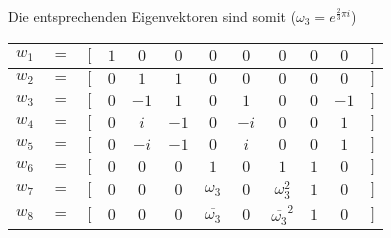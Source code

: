 Die entsprechenden Eigenvektoren sind somit ($\omega_3 = e^{\frac{2}{3} \pi i}$)
\begin{center}
\begin{tabular}{rclccccccccr}
$w_1$ & $=$ & $[$ & $1$ & $0$ & $0$ & $0$ & $0$ & $0$ & $0$ & $0$ & $]$ \\
\hline
$w_2$ & $=$ & $[$ & $0$ & $1$  & $1$ & $0$ & $0$ & $0$ & $0$ & $0$ & $]$ \\
$w_3$ & $=$ & $[$ & $0$ & $-1$ & $1$ & $0$ & $1$ & $0$ & $0$ & $-1$ & $]$ \\
$w_4$ & $=$ & $[$ & $0$ & $i$  & $-1$ & $0$ & $-i$ & $0$ & $0$ & $1$ & $]$ \\
$w_5$ & $=$ & $[$ & $0$ & $-i$ & $-1$ & $0$ & $i$ & $0$ & $0$ & $1$ & $]$ \\
\hline
$w_6$ & $=$ & $[$ & $0$ & $0$ & $0$ & $1$ & $0$ & $1$ & $1$ & $0$ & $]$ \\
$w_7$ & $=$ & $[$ & $0$ & $0$ & $0$ & $\omega_3$ & $0$ & $\omega_3^2$ & $1$ & $0$ & $]$ \\
$w_8$ & $=$ & $[$ & $0$ & $0$ & $0$ & $\overline{\omega_3}$ & $0$ & $\overline{\omega_3}^2$ & $1$ & $0$ & $]$
\end{tabular}
\end{center}
